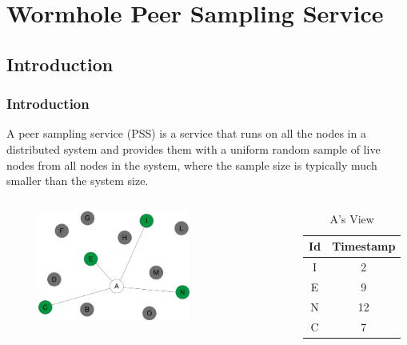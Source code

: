 \documentclass{beamer}
\begin{document}

\section{Wormhole Peer Sampling Service} %

\subsection{Introduction}

\begin{frame}
\frametitle{Introduction}
A peer sampling service (PSS) is a service that runs on all the nodes in a distributed system and provides them with a uniform random sample of live nodes from all nodes in the system, where the sample size is typically much smaller than the system size. 

\begin{columns}[t]
\begin{figure}
\includegraphics[keepaspectratio=true, width=0.7\textwidth]{images/pss.png}
\end{figure}

\begin{table}
\begin{tabular}{cc}
\toprule
\textbf{Id} & \textbf{Timestamp}\\
\midrule
I & 2\\
E & 9\\
N & 12\\
C & 7\\
\bottomrule
\end{tabular}
\caption{A's View}
\end{table}
\end{columns}

\end{frame}
\end{document}
